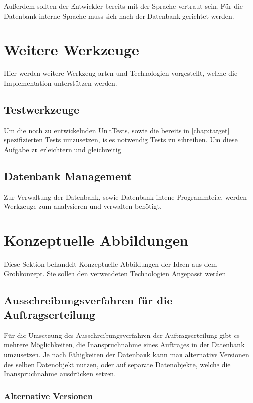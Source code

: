 Außerdem sollten der Entwickler bereits mit der Sprache vertraut sein.
Für die Datenbank-interne Sprache muss sich nach der Datenbank gerichtet werden.


\section{Weitere Werkzeuge}

Hier werden weitere Werkzeug-arten und Technologien vorgestellt,
welche die Implementation unterstützen werden.

\subsection{Testwerkzeuge}

Um die noch zu entwickelnden UnitTests,
sowie die bereits in \cref{chap:target} spezifizierten Tests umzusetzen,
is es notwendig Tests zu schreiben. Um diese Aufgabe zu erleichtern
und gleichzeitig 

\subsection{Datenbank Management}

Zur Verwaltung der Datenbank, sowie Datenbank-intene Programmteile,
werden Werkzeuge zum analysieren und verwalten benötigt.


\section{Konzeptuelle Abbildungen}

Diese Sektion behandelt Konzeptuelle Abbildungen der Ideen aus dem Grobkonzept.
Sie sollen den verwendeten Technologien Angepasst werden

\subsection{Ausschreibungsverfahren für die Auftragserteilung}

Für die Umsetzung des Ausschreibungsverfahren der Auftragserteilung gibt es
mehrere Möglichkeiten, die Inanspruchnahme eines Auftrages in
der Datenbank umzusetzen. Je nach Fähigkeiten der Datenbank kann man 
alternative Versionen des selben Datenobjekt nutzen,
oder auf separate Datenobjekte, welche die Inanspruchnahme ausdrücken setzen.

\subsubsection{Alternative Versionen}

